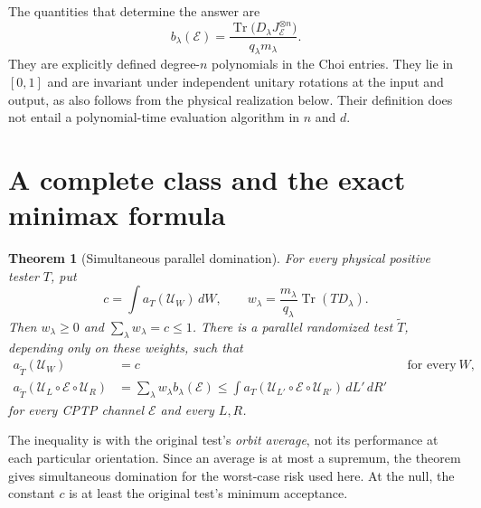\documentclass[11pt,a4paper]{article}
\newtheorem{theorem}{Theorem}[section]
\theoremstyle{remark}\newtheorem{remark}[theorem]{Remark}
\DeclareMathOperator{\Tr}{Tr}
\newcommand{\cE}{\mathcal E}
\newcommand{\cU}{\mathcal U}
\begin{document}
The quantities that determine the answer are
\begin{equation}\boxed{\displaystyle
 b_\lambda(\cE)=\frac{\Tr\bigl(D_\lambda J_{\cE}^{\otimes n}\bigr)}
 {q_\lambda m_\lambda}.}\label{eq:blambda}
\end{equation}
They are explicitly defined degree-$n$ polynomials in the Choi entries. They lie in $[0,1]$ and are invariant under independent unitary rotations at the input and output, as also follows from the physical realization below. Their definition does not entail a polynomial-time evaluation algorithm in $n$ and $d$.

\section{A complete class and the exact minimax formula}
\begin{theorem}[Simultaneous parallel domination]\label{thm:complete}
For every physical positive tester $T$, put
\begin{equation}\label{eq:weights}
 c=\int a_T(\cU_W)\,dW,\qquad
 w_\lambda=\frac{m_\lambda}{q_\lambda}\Tr(TD_\lambda).
\end{equation}
Then $w_\lambda\geq0$ and $\sum_\lambda w_\lambda=c\leq1$. There is a parallel randomized test $\widetilde T$, depending only on these weights, such that
\begin{align}
 a_{\widetilde T}(\cU_W)&=c &&\text{for every }W,\label{eq:domnull}\\
 a_{\widetilde T}(\cU_L\circ\cE\circ\cU_R)
 &=\sum_\lambda w_\lambda b_\lambda(\cE)
 \leq\int a_T(\cU_{L'}\circ\cE\circ\cU_{R'})\,dL'\,dR'
 \label{eq:domalt}
\end{align}
for every CPTP channel $\cE$ and every $L,R$.
\end{theorem}

The inequality is with the original test's \emph{orbit average}, not its performance at each particular orientation. Since an average is at most a supremum, the theorem gives simultaneous domination for the worst-case risk used here. At the null, the constant $c$ is at least the original test's minimum acceptance.
\end{document}
